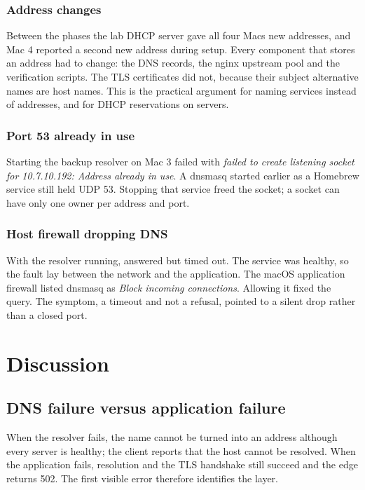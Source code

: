 \documentclass[conference]{IEEEtran}
\newcommand{\code}[1]{\texttt{\detokenize{#1}}}
\begin{document}
\subsubsection{Address changes}
Between the phases the lab DHCP server gave all four Macs new addresses,
and Mac 4 reported a second new address during setup. Every component
that stores an address had to change: the DNS records, the nginx upstream
pool and the verification scripts. The TLS certificates did not, because
their subject alternative names are host names. This is the practical
argument for naming services instead of addresses, and for DHCP
reservations on servers.

\subsubsection{Port 53 already in use}
Starting the backup resolver on Mac 3 failed with \emph{failed to create
listening socket for 10.7.10.192: Address already in use}. A dnsmasq
started earlier as a Homebrew service still held UDP 53. Stopping that
service freed the socket; a socket can have only one owner per address and
port.

\subsubsection{Host firewall dropping DNS}
With the resolver running, \code{dig @127.0.0.1} answered but
\code{dig @10.7.10.192} timed out. The service was healthy, so the fault
lay between the network and the application. The macOS application
firewall listed dnsmasq as \emph{Block incoming connections}. Allowing it
fixed the query. The symptom, a timeout and not a refusal, pointed to a
silent drop rather than a closed port.

\section{Discussion}\label{sec:discussion}

\subsection{DNS failure versus application failure}
When the resolver fails, the name cannot be turned into an address
although every server is healthy; the client reports that the host cannot
be resolved. When the application fails, resolution and the TLS handshake
still succeed and the edge returns 502. The first visible error therefore
identifies the layer.
\end{document}
